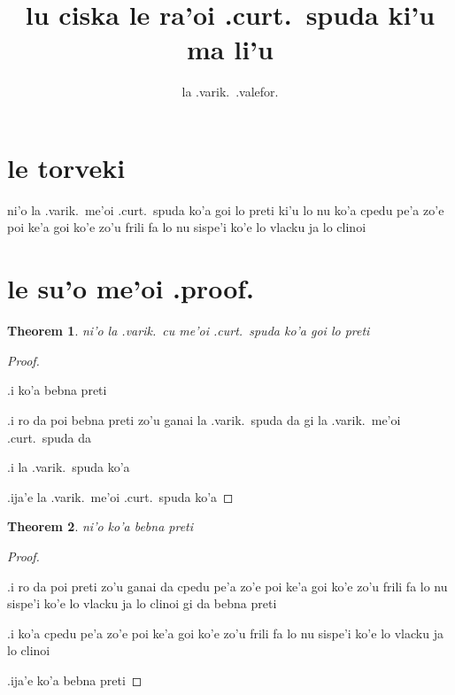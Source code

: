 \documentclass{article}
\title{lu ciska le ra'oi .curt.\ spuda ki'u ma li'u}
\author{la .varik.\ .valefor.}
\begin{document}
\newtheorem{thm}{Theorem}
\maketitle

\section{le torveki}
ni'o la .varik.\ me'oi .curt.\ spuda ko'a goi lo preti ki'u lo nu ko'a cpedu pe'a zo'e poi ke'a goi ko'e zo'u frili fa lo nu sispe'i ko'e lo vlacku ja lo clinoi

\section{le su'o me'oi .proof.}
\begin{thm}
	ni'o la .varik.\ cu me'oi .curt.\ spuda ko'a goi lo preti
\end{thm}
\begin{proof}
	${}$

	.i ko'a bebna preti

	.i ro da poi bebna preti zo'u ganai la .varik.\ spuda da gi la .varik.\ me'oi .curt.\ spuda da

	.i la .varik.\ spuda ko'a

	.ija'e la .varik.\ me'oi .curt.\ spuda ko'a
\end{proof}

\begin{thm}
	ni'o ko'a bebna preti
\end{thm}
\begin{proof}
	${}$

	.i ro da poi preti zo'u ganai da cpedu pe'a zo'e poi ke'a goi ko'e zo'u frili fa lo nu sispe'i ko'e lo vlacku ja lo clinoi gi da bebna preti

	.i ko'a cpedu pe'a zo'e poi ke'a goi ko'e zo'u frili fa lo nu sispe'i ko'e lo vlacku ja lo clinoi

	.ija'e ko'a bebna preti
\end{proof}
\end{document}
